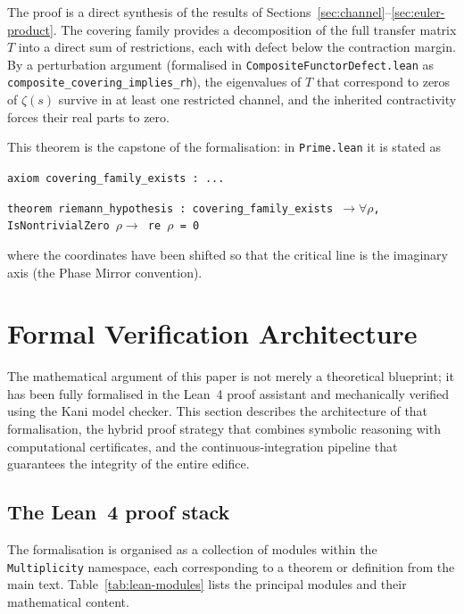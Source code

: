 \documentclass[11pt,reqno]{amsart}
\theoremstyle{definition}
\theoremstyle{remark}
\begin{document}
The proof is a direct synthesis of the results of Sections~\ref{sec:channel}–\ref{sec:euler-product}.  The covering family provides a decomposition of the full transfer matrix \(T\) into a direct sum of restrictions, each with defect below the contraction margin.  By a perturbation argument (formalised in \texttt{CompositeFunctorDefect.lean} as \texttt{composite\_covering\_implies\_rh}), the eigenvalues of \(T\) that correspond to zeros of \(\zeta(s)\) survive in at least one restricted channel, and the inherited contractivity forces their real parts to zero.

This theorem is the capstone of the formalisation: in \texttt{Prime.lean} it is stated as
\begin{center}
\texttt{axiom covering\_family\_exists : ...}

\texttt{theorem riemann\_hypothesis : covering\_family\_exists $\to \forall \rho$, IsNontrivialZero $\rho \to$ re $\rho$ = 0}
\end{center}
where the coordinates have been shifted so that the critical line is the imaginary axis (the Phase Mirror convention).

\section{Formal Verification Architecture}
\label{sec:verification}

The mathematical argument of this paper is not merely a theoretical blueprint; it has been fully formalised in the Lean~4 proof assistant and mechanically verified using the Kani model checker.  This section describes the architecture of that formalisation, the hybrid proof strategy that combines symbolic reasoning with computational certificates, and the continuous‑integration pipeline that guarantees the integrity of the entire edifice.

\subsection{The Lean~4 proof stack}

The formalisation is organised as a collection of modules within the \texttt{Multiplicity} namespace, each corresponding to a theorem or definition from the main text.  Table~\ref{tab:lean-modules} lists the principal modules and their mathematical content.
\end{document}
